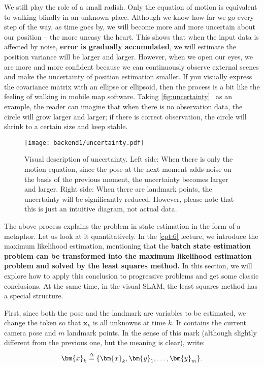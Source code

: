We still play the role of a small radish. Only the equation of motion is equivalent to walking blindly in an unknown place. Although we know how far we go every step of the way, as time goes by, we will become more and more uncertain about our position – the more uneasy the heart. This shows that when the input data is affected by noise, \textbf{error is gradually accumulated}, we will estimate the position variance will be larger and larger. However, when we open our eyes, we are more and more confident because we can continuously observe external scenes and make the uncertainty of position estimation smaller. If you visually express the covariance matrix with an ellipse or ellipsoid, then the process is a bit like the feeling of walking in mobile map software. Taking \autoref{fig:uncertainty}~ as an example, the reader can imagine that when there is no observation data, the circle will grow larger and larger; if there is correct observation, the circle will shrink to a certain size and keep stable.

\begin{figure}[!ht]
\centering
\texttt{[image: backend1/uncertainty.pdf]}
\caption{Visual description of uncertainty. Left side: When there is only the motion equation, since the pose at the next moment adds noise on the basis of the previous moment, the uncertainty becomes larger and larger. Right side: When there are landmark points, the uncertainty will be significantly reduced. However, please note that this is just an intuitive diagram, not actual data. }
\label{fig:uncertainty}
\end{figure}

The above process explains the problem in state estimation in the form of a metaphor. Let us look at it quantitatively. In the \ref{cpt:6} lecture, we introduce the maximum likelihood estimation, mentioning that the \textbf{batch state estimation problem can be transformed into the maximum likelihood estimation problem and solved by the least squares method. } In this section, we will explore how to apply this conclusion to progressive problems and get some classic conclusions. At the same time, in the visual SLAM, the least squares method has a special structure.

First, since both the pose and the landmark are variables to be estimated, we change the token so that $\bm{x}_k$ is all unknowns at time $k$. It contains the current camera pose and $m$ landmark points. In the sense of this mark (although slightly different from the previous one, but the meaning is clear), write:
\begin{equation}
    \bm{x}_k  \buildrel \Delta \over =  \{ \bm{x}_k, \bm{y}_1, \ldots, \bm{y}_m \}.
\end{equation}


